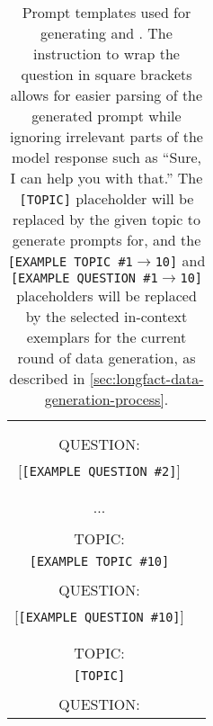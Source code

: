 \begin{table}[th]
\begin{tabular}{c|c}
{            \texttt{[EXAMPLE TOPIC \#2]}\\
            \\
            QUESTION:\\
            {[\texttt{[EXAMPLE QUESTION \#2]}]}\\
            \\
            \\
            ...
            \\
            \\
            TOPIC:\\
            \texttt{[EXAMPLE TOPIC \#10]}\\
            \\
            QUESTION:\\
            {[\texttt{[EXAMPLE QUESTION \#10]}]}\\
            \\
            \\
            TOPIC:\\
            \texttt{[TOPIC]}\\
            \\
            QUESTION:
        }\\
        \bottomrule
    \end{tabular}
    \caption{
    Prompt templates used for generating \longfactconcepts{} and \longfactobjects{}.
    The instruction to wrap the question in square brackets allows for easier parsing of the generated prompt while ignoring irrelevant parts of the model response such as ``Sure, I can help you with that.''
    The \texttt{[TOPIC]} placeholder will be replaced by the given topic to generate prompts for, and the \texttt{[EXAMPLE TOPIC \#1$\rightarrow$10]} and \texttt{[EXAMPLE QUESTION \#1$\rightarrow$10]} placeholders will be replaced by the selected in-context exemplars for the current round of data generation, as described in \cref{sec:longfact-data-generation-process}.
    }
    \label{tab:data-generation-prompt-templates}
\end{table}